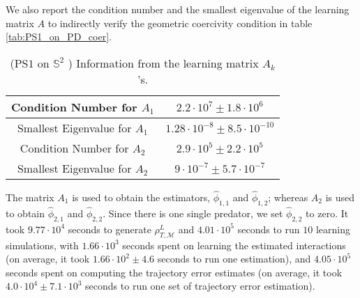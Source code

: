 \documentclass[11pt]{article}
\newcommand{\mM}{\mathcal{M}}
\newcommand{\idxcl}{k}
\newcommand{\intkernel}{\phi}
\newcommand{\lintkernel}{\widehat{\intkernel}}
\begin{document}
We also report the condition number and the smallest eigenvalue of the learning matrix $A$ to indirectly verify the geometric coercivity condition in table \ref{tab:PS1_on_PD_coer}.
\begin{table}[H]
\centering
\small{\begin{tabular}{ c || c } 
\hline
Condition Number for $A_1$    & $2.2 \cdot 10^{7} \pm 1.8 \cdot 10^{6}$ \\ 
\hline
Smallest Eigenvalue for $A_1$ & $1.28 \cdot 10^{-8} \pm 8.5 \cdot 10^{-10}$ \\
\hline
\hline
Condition Number for $A_2$    & $2.9 \cdot 10^{5} \pm 2.2 \cdot 10^{5}$ \\ 
\hline
Smallest Eigenvalue for $A_2$ & $9 \cdot 10^{-7} \pm 5.7 \cdot 10^{-7}$ \\
\hline
\end{tabular}}
\caption{(PS$1$ on  $\mathbb{S}^2$ ) Information from the learning matrix $A_{\idxcl}$'s.}
\label{tab:PS1_on_S2_coer}
\end{table}
The matrix $A_1$ is used to obtain the estimators, $\lintkernel_{1, 1}$ and $\lintkernel_{1, 2}$; whereas $A_2$ is used to obtain $\lintkernel_{2, 1}$ and $\lintkernel_{2, 2}$.  Since there is one single predator, we set $\lintkernel_{2, 2}$ to zero.  It took $9.77 \cdot 10^{4}$ seconds to generate $\rho_{T, \mM}^L$ and $4.01 \cdot 10^{5}$ seconds to run $10$ learning simulations, with $1.66 \cdot 10^{3}$ seconds spent on learning the estimated interactions (on average, it took $1.66 \cdot 10^{2} \pm 4.6$ seconds to run one estimation), and $4.05 \cdot 10^{5}$ seconds spent on computing the trajectory error estimates (on average, it took $4.0 \cdot 10^{4} \pm 7.1 \cdot 10^{3}$ seconds to run one set of trajectory error estimation).
\end{document}
